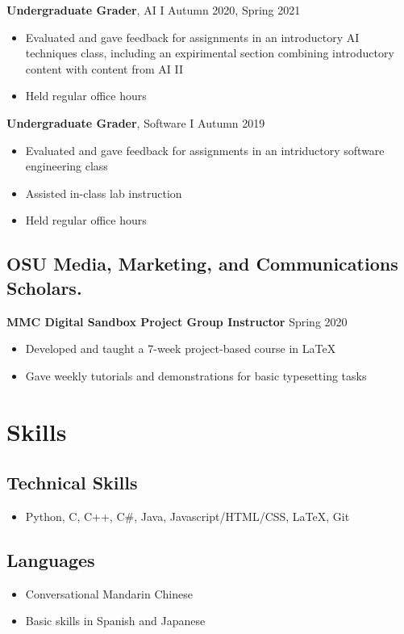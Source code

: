 \documentclass[10pt,sans]{moderncv}
\begin{document}
\textbf{Undergraduate Grader}, AI I
\hfill Autumn 2020, Spring 2021
\begin{itemize}
    \item Evaluated and gave feedback for assignments in an introductory AI techniques class,
    including an expirimental section combining introductory content with content from AI II
    \item Held regular office hours
\end{itemize}

\textbf{Undergraduate Grader}, Software I
\hfill Autumn 2019
\begin{itemize}
    \item Evaluated and gave feedback for assignments in an intriductory software engineering class
    \item Assisted in-class lab instruction
    \item Held regular office hours
\end{itemize}

\subsection*{OSU Media, Marketing, and Communications Scholars.}

\textbf{MMC Digital Sandbox Project Group Instructor}
\hfill Spring 2020
\begin{itemize}
    \item Developed and taught a 7-week project-based course in LaTeX
    \item Gave weekly tutorials and demonstrations for basic typesetting tasks
\end{itemize}

\section*{Skills}

\subsection*{Technical Skills}
\begin{itemize}
    \item Python, C, C++, C\#, Java, Javascript/HTML/CSS, LaTeX, Git
\end{itemize}

\subsection*{Languages}
\begin{itemize}
    \item Conversational Mandarin Chinese
    \item Basic skills in Spanish and Japanese
\end{itemize}
\end{document}
